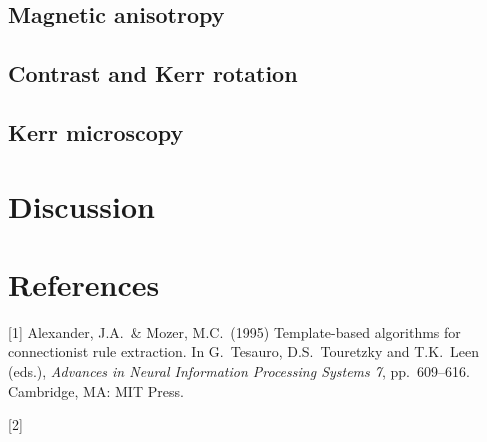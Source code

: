 \documentclass{article}
\begin{document}
\subsection{Magnetic anisotropy}
\subsection{Contrast and Kerr rotation}
\subsection{Kerr microscopy}

\section{Discussion}


\section*{References}

[1] Alexander, J.A.\ \& Mozer, M.C.\ (1995) Template-based algorithms for
connectionist rule extraction. In G.\ Tesauro, D.S.\ Touretzky and T.K.\ Leen
(eds.), {\it Advances in Neural Information Processing Systems 7},
pp.\ 609--616. Cambridge, MA: MIT Press.

[2]
\end{document}
